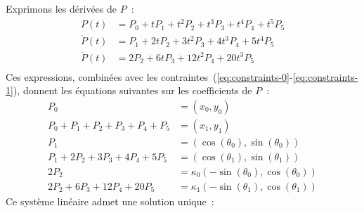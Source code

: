 \documentclass {article}
\begin{document}
Exprimons les dérivées de $P$~:
\begin {align*}
P(t) &= P_0 + t P_1 + t^2 P_2 + t^3 P_3 + t^4 P_4 + t^5 P_5 \\
\dot {P}(t) &= P_1 + 2t P_2 + 3t^2 P_3 + 4t^3 P_4 + 5t^4 P_5 \\
\ddot {P}(t) &= 2 P_2 + 6t P_3 + 12t^2 P_4 + 20t^3 P_5 \\
\end {align*}
Ces expressions, combinées avec les contraintes~(\ref{eq:constraints-0}-\ref{eq:constraints-1}), donnent les équations suivantes sur les coefficients de $P$~:
\begin {align*}
P_0 &= (x_0,y_0) \\
P_0 + P_1 + P_2 + P_3 + P_4 + P_5 &= (x_1,y_1) \\
P_1 &= (\cos(\theta_0), \sin(\theta_0)) \\
P_1 + 2 P_2 + 3 P_3 + 4 P_4 + 5 P_5 &= (\cos(\theta_1), \sin(\theta_1))\\
2 P_2 &= \kappa_0 (-\sin (\theta_0), \cos (\theta_0)) \\
2 P_2 + 6 P_3 + 12 P_4 + 20 P_5 &= \kappa_1 (-\sin (\theta_1), \cos (\theta_1))
\end {align*}
Ce système linéaire admet une solution unique~:
\end{document}
